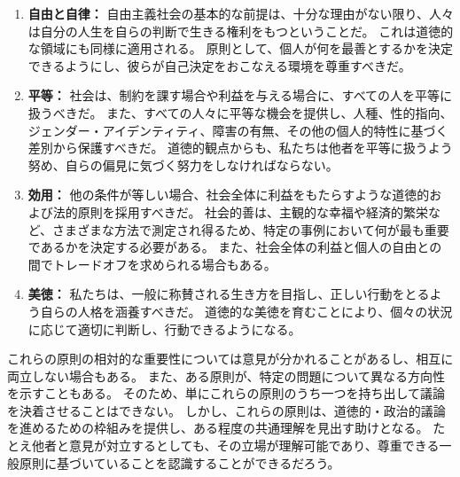 \documentclass[paper=a4,book,openany]{jlreq}
\begin{document}
\begin{enumerate}
    \item \textbf{自由と自律：}
    自由主義社会の基本的な前提は、十分な理由がない限り、人々は自分の人生を自らの判断で生きる権利をもつということだ。
これは道徳的な領域にも同様に適用される。
原則として、個人が何を最善とするかを決定できるようにし、彼らが自己決定をおこなえる環境を尊重すべきだ。

    \item \textbf{平等：}
    社会は、制約を課す場合や利益を与える場合に、すべての人を平等に扱うべきだ。
また、すべての人々に平等な機会を提供し、人種、性的指向、ジェンダー・アイデンティティ、障害の有無、その他の個人的特性に基づく差別から保護すべきだ。
道徳的観点からも、私たちは他者を平等に扱うよう努め、自らの偏見に気づく努力をしなければならない。

    \item \textbf{効用：}
    他の条件が等しい場合、社会全体に利益をもたらすような道徳的および法的原則を採用すべきだ。
社会的善は、主観的な幸福や経済的繁栄など、さまざまな方法で測定され得るため、特定の事例において何が最も重要であるかを決定する必要がある。
また、社会全体の利益と個人の自由との間でトレードオフを求められる場合もある。

    \item \textbf{美徳：}
    私たちは、一般に称賛される生き方を目指し、正しい行動をとるよう自らの人格を涵養すべきだ。
道徳的な美徳を育むことにより、個々の状況に応じて適切に判断し、行動できるようになる。

\end{enumerate}

これらの原則の相対的な重要性については意見が分かれることがあるし、相互に両立しない場合もある。
また、ある原則が、特定の問題について異なる方向性を示すこともある。
そのため、単にこれらの原則のうち一つを持ち出して議論を決着させることはできない。
しかし、これらの原則は、道徳的・政治的議論を進めるための枠組みを提供し、ある程度の共通理解を見出す助けとなる。
たとえ他者と意見が対立するとしても、その立場が理解可能であり、尊重できる一般原則に基づいていることを認識することができるだろう。

\end{document}
